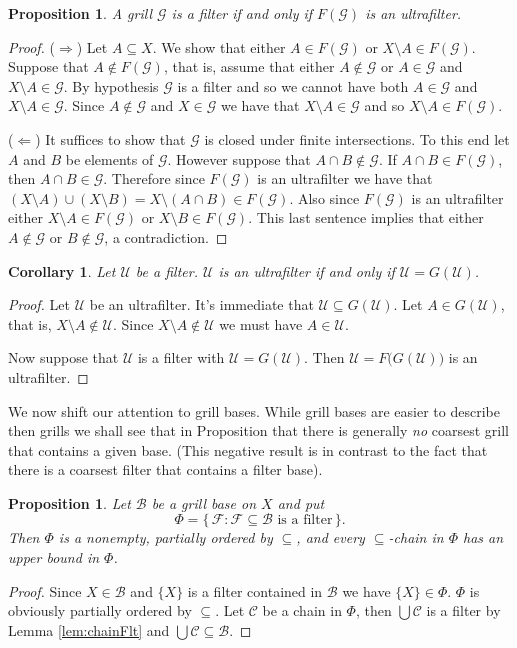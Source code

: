 \documentclass[12pt]{article}
\theoremstyle{plain}
\newtheorem{prop}[thm]{Proposition}
\newtheorem{cor}[thm]{Corollary}
\theoremstyle{definition}
\newcommand{\calB}{\mathcal{B}}
\newcommand{\calC}{\mathcal{C}}
\newcommand{\calF}{\mathcal{F}}
\newcommand{\calG}{\mathcal{G}}
\newcommand{\calU}{\mathcal{U}}
\begin{document}
\begin{prop}
  A grill $\calG$ is a filter if and only if $F(\calG)$ is an ultrafilter.
\end{prop}
\begin{proof}
  ($\Rightarrow$)
  Let $A \subseteq X$.
  We show that either $A \in F(\calG)$ or $X \setminus A \in F(\calG)$.
  Suppose that $A \not\in F(\calG)$, that is, assume that either $A \not\in \calG$ or $A \in \calG$ and $X \setminus A \in \calG$.
  By hypothesis $\calG$ is a filter and so we cannot have both $A \in \calG$ and $X \setminus A \in \calG$.
  Since $A \not\in \calG$ and $X \in \calG$ we have that $X \setminus A \in \calG$ and so $X \setminus A \in F(\calG)$.

  ($\Leftarrow$)
  It suffices to show that $\calG$ is closed under finite intersections.
  To this end let $A$ and $B$ be elements of $\calG$.
  However suppose that $A \cap B \not\in \calG$.
  If $A \cap B \in F(\calG)$, then $A \cap B \in \calG$.
  Therefore since $F(\calG)$ is an ultrafilter we have that $(X \setminus A) \cup (X \setminus B) = X \setminus (A \cap B) \in F(\calG)$.
  Also since $F(\calG)$ is an ultrafilter either $X \setminus A \in F(\calG)$ or $X \setminus B \in F(\calG)$. 
  This last sentence implies that either $A \not\in \calG$ or $B \not\in \calG$, a contradiction.
\end{proof}
\begin{cor}
  Let $\calU$ be a filter.
  $\calU$ is an ultrafilter if and only if $\calU = G(\calU)$.
\end{cor}
\begin{proof}
  Let $\calU$ be an ultrafilter.
  It's immediate that $\calU \subseteq G(\calU)$.
  Let $A \in G(\calU)$, that is, $X \setminus A \not\in \calU$. 
  Since $X \setminus A \not\in \calU$ we must have $A \in \calU$.

  Now suppose that $\calU$ is a filter with $\calU = G(\calU)$.
  Then $\calU = F\bigl(G(\calU)\bigr)$ is an ultrafilter.
\end{proof}

We now shift our attention to grill bases.
While grill bases are easier to describe then grills we shall see that in Proposition %
that there is generally \textsl{no} coarsest grill that contains a given base.
(This negative result is in contrast to the fact that there is a coarsest filter that contains a filter base).

\begin{prop}
  \label{prop:grlBasePhi}
  Let $\calB$ be a grill base on $X$ and put 
  \[
    \Phi = \{\, \calF : \mbox{$\calF \subseteq \calB$ is a filter} \,\}.
  \]
  Then $\Phi$ is a nonempty, partially ordered by $\subseteq$, and every \mbox{$\subseteq$-chain} in $\Phi$ has an upper bound in $\Phi$.
\end{prop}
\begin{proof}
  Since $X \in \calB$ and $\{X\}$ is a filter contained in $\calB$ we have $\{X\} \in \Phi$.
  $\Phi$ is obviously partially ordered by $\subseteq$.
  Let $\calC$ be a chain in $\Phi$, then $\bigcup\calC$ is a filter by Lemma \ref{lem:chainFlt} and $\bigcup\calC \subseteq \calB$.
\end{proof}
\end{document}
